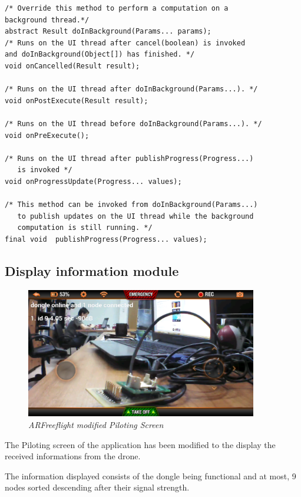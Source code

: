 \begin{lstlisting}
/* Override this method to perform a computation on a 
background thread.*/
abstract Result	doInBackground(Params... params);
/* Runs on the UI thread after cancel(boolean) is invoked 
and doInBackground(Object[]) has finished. */
void onCancelled(Result result);

/* Runs on the UI thread after doInBackground(Params...). */
void onPostExecute(Result result);

/* Runs on the UI thread before doInBackground(Params...). */
void onPreExecute();

/* Runs on the UI thread after publishProgress(Progress...) 
   is invoked */
void onProgressUpdate(Progress... values);

/* This method can be invoked from doInBackground(Params...) 
   to publish updates on the UI thread while the background 
   computation is still running. */
final void	publishProgress(Progress... values);

\end{lstlisting}

\subsection{Display information module}

\begin{figure}[ht]
\begin{center}
\includegraphics[width=0.9\textwidth]{implementation/android_info.png}
\end{center}
\caption{\small \itshape{ARFreeflight modified Piloting Screen}}
\end{figure}

The Piloting screen of the application has been modified to the display the received informations from the drone. 

The information displayed consists of the dongle being functional and at most, 9 nodes sorted descending after their signal strength. 


